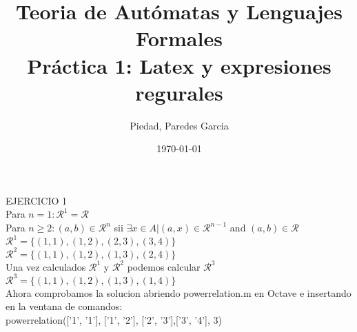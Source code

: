 \documentclass[fleqn, 10pt]{article}
\title{Teoria de Autómatas y Lenguajes Formales \\[.4\baselineskip] Práctica 1: Latex y expresiones regurales}
\author{Piedad, Paredes Garcia}
\date{\today}
\begin{document}
\maketitle

EJERCICIO 1
\\[.8\baselineskip]
Para $ n=1: \mathcal{R} ^1 = \mathcal{R}$ \\
Para $n\geq2: (a,b) \in \mathcal{R} ^n $ sii $ \exists x \in A | (a,x) \in \mathcal{R} ^{n-1}$ and $(a,b) \in \mathcal{R}$ \\[.8\baselineskip]
$\mathcal{R} ^1 = \{(1,1),(1,2),(2,3),(3,4)\}$\\
$\mathcal{R} ^2 = \{(1,1),(1,2),(1,3),(2,4)\}$\\
Una vez calculados $\mathcal{R} ^1$ y $\mathcal{R} ^2$ podemos calcular $\mathcal{R} ^3 $\\
 $\mathcal{R} ^3 = \{(1,1),(1,2),(1,3),(1,4)\}$ \\[.8\baselineskip]
 
 Ahora comprobamos la solucion abriendo powerrelation.m en Octave e insertando en la ventana de comandos: \\
 powerrelation({['1', '1'], ['1', '2'], ['2', '3'],['3', '4']}, 3)
 
 
\end{document}

